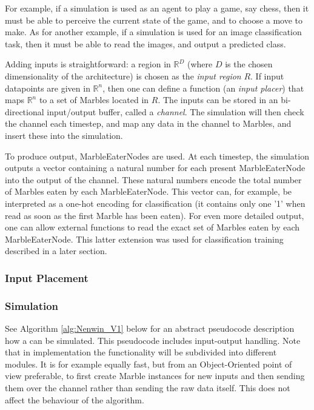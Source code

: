 For example, if a \nenwin simulation is used as an agent to play a game, say chess, then it must be able to perceive the current state of the game, and to choose a move to make. As for another example, if a \nenwin simulation is used for an image classification task, then it must be able to read the images, and output a predicted class.

Adding inputs is straightforward: a region in $\mathbb{R}^D$ (where $D$ is the chosen dimensionality of the \nenwin architecture) is chosen as the \textit{input region} $R$. If input datapoints are given in $\mathbb{R}^n$, then one can define a function (an \textit{input placer}) that maps $\mathbb{R}^n$ to a set of Marbles located in $R$. The inputs can be stored in an bi-directional input/output buffer, called a \textit{channel}. The simulation will then check the channel each timestep, and map any data in the channel to Marbles, and insert these into the simulation.

To produce output, MarbleEaterNodes are used. At each timestep, the simulation outputs a vector containing a natural number for each present MarbleEaterNode into the output of the channel. These natural numbers encode the total number of Marbles eaten by each MarbleEaterNode. This vector can, for example, be interpreted as a one-hot encoding for classification (it contains only one '1' when read as soon as the first Marble has been eaten).
For even more detailed output, one can allow external functions to read the exact set of Marbles eaten by each MarbleEaterNode. This latter extension was used for classification training described in a later section.

\subsubsection{Input Placement}


\subsubsection{Simulation}
See Algorithm \ref{alg:Nenwin_V1} below for an abstract pseudocode description how a \nenwin can be simulated. This pseudocode includes input-output handling. Note that in implementation the functionality will be subdivided into different modules. 
It is for example equally fast, but from an Object-Oriented point of view preferable, to first create Marble instances for new inputs and then sending them over the channel rather than sending the raw data itself. This does not affect the behaviour of the algorithm.

